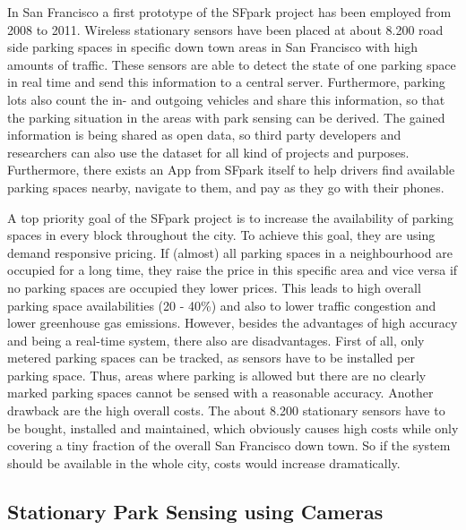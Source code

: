 In San Francisco a first prototype of the SFpark project \cite{SFPark} has been employed from 2008 to 2011. Wireless stationary sensors have been placed at about 8.200 road side parking spaces in specific down town areas in San Francisco with high amounts of traffic. These sensors are able to detect the state of one parking space in real time and send this information to a central server. Furthermore, parking lots also count the in- and outgoing vehicles and share this information, so that the parking situation in the areas with park sensing can be derived. The gained information is being shared as open data, so third party developers and researchers can also use the dataset for all kind of projects and purposes. Furthermore, there exists an App from SFpark itself to help drivers find available parking spaces nearby, navigate to them, and pay as they go with their phones.

A top priority goal of the SFpark project is to increase the availability of parking spaces in every block throughout the city. To achieve this goal, they are using demand responsive pricing. If (almost) all parking spaces in a neighbourhood are occupied for a long time, they raise the price in this specific area and vice versa if no parking spaces are occupied they lower prices. This leads to high overall parking space availabilities (20 - 40\%) and also to lower traffic congestion and lower greenhouse gas emissions. However, besides the advantages of high accuracy and being a real-time system, there also are disadvantages. First of all, only metered parking spaces can be tracked, as sensors have to be installed per parking space. Thus, areas where parking is allowed but there are no clearly marked parking spaces cannot be sensed with a reasonable accuracy. Another drawback are the high overall costs. The about 8.200 stationary sensors have to be bought, installed and maintained, which obviously causes high costs while only covering a tiny fraction of the overall San Francisco down town. So if the system should be available in the whole city, costs would increase dramatically.






\subsection{Stationary Park Sensing using Cameras}
\label{sec:stationary_park_sensing_cameras}

